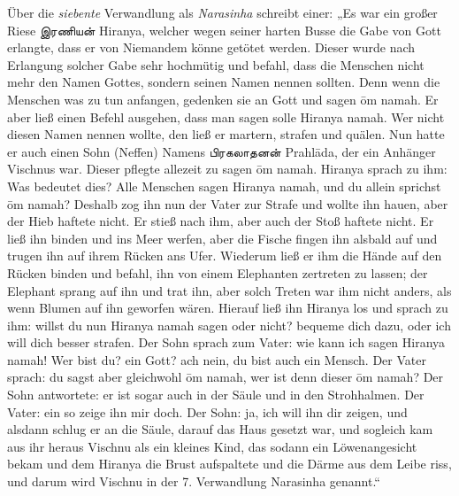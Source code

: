 \documentclass{article}
\newcommand{\TamilText}[1]{\texttamil{#1}}
\newcommand{\tam}[1]{\TamilText{#1}}
\begin{document}
Über die \emph{siebente} Verwandlung als \emph{Narasinha} schreibt einer: „Es war ein großer Riese \tam{இரணியன்} Hiranya, welcher wegen seiner harten Busse die Gabe von Gott erlangte, dass er von Niemandem könne getötet werden. Dieser wurde nach Erlangung solcher Gabe sehr hochmütig und befahl, dass die Menschen nicht mehr den Namen Gottes, sondern seinen Namen nennen sollten. Denn wenn die Menschen was zu tun anfangen, gedenken sie an Gott und sagen \={o}m namah. Er aber ließ einen Befehl ausgehen, dass man sagen solle Hiranya namah. Wer nicht diesen Namen nennen wollte, den ließ er martern, strafen und quälen. Nun hatte er auch einen Sohn (Neffen) Namens \tam{பிரகலாதனன்} Prahl\={a}da, der ein Anhänger Vischnus war. Dieser pflegte allezeit zu sagen \={o}m namah. Hiranya sprach zu ihm: Was bedeutet dies? Alle Menschen sagen Hiranya namah, und du allein sprichst \={o}m namah? Deshalb zog ihn nun der Vater zur Strafe und wollte ihn hauen, aber der Hieb haftete nicht. Er stieß nach ihm, aber auch der Stoß haftete nicht. Er ließ ihn binden und ins Meer werfen, aber die Fische fingen ihn alsbald auf und trugen ihn auf ihrem Rücken ans Ufer. Wiederum ließ er ihm die Hände auf den Rücken binden und befahl, ihn von einem Elephanten zertreten zu lassen; der Elephant sprang auf ihn und trat ihn, aber solch Treten war ihm nicht anders, als wenn Blumen auf ihn geworfen wären. Hierauf ließ ihn Hiranya los und sprach zu ihm: willst du nun Hiranya namah sagen oder nicht? bequeme dich dazu, oder ich will dich besser strafen. Der Sohn sprach zum Vater: wie kann ich sagen Hiranya namah! Wer bist du? ein Gott? ach nein, du bist auch ein Mensch. Der Vater sprach: du sagst aber gleichwohl \={o}m namah, wer ist denn dieser \={o}m namah? Der Sohn antwortete: er ist sogar auch in der Säule und in den Strohhalmen. Der Vater: ein so zeige ihn mir doch. Der Sohn: ja, ich will ihn dir zeigen, und alsdann schlug er an die Säule, darauf das Haus gesetzt war, und sogleich kam aus ihr heraus Vischnu als ein kleines Kind, das sodann ein Löwenangesicht bekam und dem Hiranya die Brust aufspaltete und die Därme aus dem Leibe riss, und darum wird Vischnu in der 7. Verwandlung Narasinha genannt.“
\end{document}
